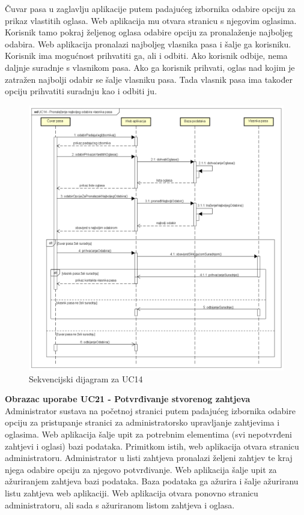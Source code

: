 				Čuvar pasa u zaglavlju aplikacije putem padajućeg izbornika odabire opciju za prikaz vlastitih oglasa. Web aplikacija mu otvara stranicu s njegovim oglasima. Korisnik tamo pokraj željenog oglasa odabire opciju za pronalaženje najboljeg odabira. Web aplikacija pronalazi najboljeg vlasnika pasa i šalje ga korisniku. Korisnik ima mogućnost prihvatiti ga, ali i odbiti. Ako korisnik odbije, nema daljnje suradnje s vlasnikom pasa. Ako ga korisnik prihvati, oglas nad kojim je zatražen najbolji odabir se šalje vlasniku pasa. Tada vlasnik pasa ima također opciju prihvatiti suradnju kao i odbiti ju.
				
				\begin{figure}[htb]
					\centering
					\includegraphics[width=14cm]{slike/Sekvencijski dijagram - UC14}
					\caption{Sekvencijski dijagram za UC14}
					\label{fig:Sekvencijski-UC14}
				\end{figure}
				\eject		
				
				\textbf{Obrazac uporabe UC21 - Potvrđivanje stvorenog zahtjeva}\\
				
				Administrator sustava na početnoj stranici putem padajućeg izbornika odabire opciju za pristupanje stranici za administratorsko upravljanje zahtjevima i oglasima. Web aplikacija šalje upit za potrebnim elementima (svi nepotvrđeni zahtjevi i oglasi) bazi podataka. Primitkom istih, web aplikacija otvara stranicu administratoru. Administrator u listi zahtjeva pronalazi željeni zahtjev te kraj njega odabire opciju za njegovo potvrđivanje. Web aplikacija šalje upit za ažuriranjem zahtjeva bazi podataka. Baza podataka ga ažurira i šalje ažuriranu listu zahtjeva web aplikaciji. Web aplikacija otvara ponovno stranicu administratoru, ali sada s ažuriranom listom zahtjeva i oglasa.
				
